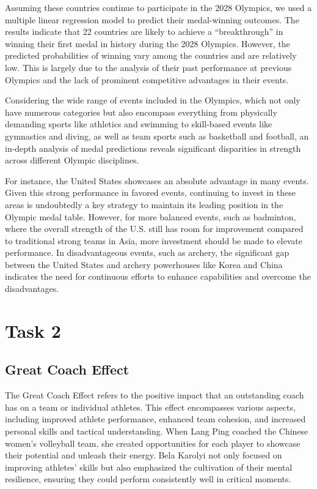 \documentclass{mcmthesis}
\begin{document}
Assuming these countries continue to participate in the 2028 Olympics, we used a multiple linear regression model to predict their medal-winning outcomes. The results indicate that 22 countries are likely to achieve a “breakthrough” in winning their first medal in history during the 2028 Olympics. However, the predicted probabilities of winning vary among the countries and are relatively low. This is largely due to the analysis of their past performance at previous Olympics and the lack of prominent competitive advantages in their events.

Considering the wide range of events included in the Olympics, which not only have numerous categories but also encompass everything from physically demanding sports like athletics and swimming to skill-based events like gymnastics and diving, as well as team sports such as basketball and football, an in-depth analysis of medal predictions reveals significant disparities in strength across different Olympic disciplines.

For instance, the United States showcases an absolute advantage in many events. Given this strong performance in favored events, continuing to invest in these areas is undoubtedly a key strategy to maintain its leading position in the Olympic medal table. However, for more balanced events, such as badminton, where the overall strength of the U.S. still has room for improvement compared to traditional strong teams in Asia, more investment should be made to elevate performance. In disadvantageous events, such as archery, the significant gap between the United States and archery powerhouses like Korea and China indicates the need for continuous efforts to enhance capabilities and overcome the disadvantages.

\section{Task 2}
\subsection{Great Coach Effect}

The Great Coach Effect refers to the positive impact that an outstanding coach has on a team or individual athletes. This effect encompasses various aspects, including improved athlete performance, enhanced team cohesion, and increased personal skills and tactical understanding. When Lang Ping coached the Chinese women's volleyball team, she created opportunities for each player to showcase their potential and unleash their energy. Bela Karolyi not only focused on improving athletes' skills but also emphasized the cultivation of their mental resilience, ensuring they could perform consistently well in critical moments.
\end{document}
